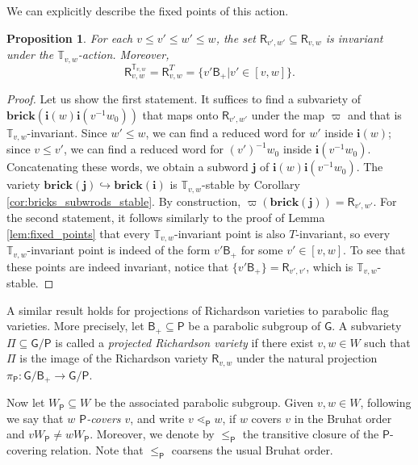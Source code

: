 \documentclass[a4paper, 11pt]{amsart}
\newcommand{\parabolic}{\mathsf{P}}
\newcommand{\brick}{\mathbf{brick}}
\newcommand{\borel}{\mathsf{B}}
\newcommand{\rich}[1]{\mathsf{R}_{#1}}
\newcommand{\word}[1]{\mathbf{#1}}
\newcommand{\group}{\mathsf{G}}
\newcommand{\dil}[1]{\mathbb{T}_{#1}}
\newtheorem{proposition}[theorem]{Proposition}%
\theoremstyle{definition}
\begin{document}
We can explicitly describe the fixed points of this action.

\begin{proposition}\label{prop:fixed-points-richardsons}
For each $v \leq v' \leq w' \leq w$, the set $\rich{v',w'} \subseteq \rich{v,w}$ is invariant under the $\dil{v,w}$-action. Moreover,
\[
\rich{v,w}^{\dil{v,w}} = \rich{v,w}^{T} = \{v'\borel_{+} | v' \in [v,w]\}.\]
\end{proposition}
\begin{proof}
Let us show the first statement. It suffices to find a subvariety of $\brick(\word{i}(w)\word{i}(v^{-1}w_0))$ that maps onto $\rich{v',w'}$ under the map $\varpi$ and that is $\dil{v,w}$-invariant. Since $w' \leq w$, we can find a reduced word for $w'$ inside $\word{i}(w)$; since $v \leq v'$, we can find a reduced word for $(v')^{-1}w_0$ inside $\word{i}(v^{-1}w_0)$. Concatenating these words, we obtain a subword $\word{j}$ of $\word{i}(w)\word{i}(v^{-1}w_0)$. The variety $\brick(\word{j}) \hookrightarrow \brick(\word{i})$ is $\dil{v,w}$-stable by Corollary \ref{cor:bricks_subwrods_stable}. By construction, $\varpi(\brick(\word{j})) = \rich{v',w'}$. For the second statement, it follows similarly to the proof of Lemma \ref{lem:fixed_points} that every $\dil{v,w}$-invariant point is also $T$-invariant, so every $\dil{v,w}$-invariant point is indeed of the form $v'\borel_{+}$ for some $v' \in [v,w]$. To see that these points are indeed invariant, notice that $\{v'\borel_{+}\} = \rich{v',v'}$, which is $\dil{v,w}$-stable.
\end{proof}

A similar result holds for projections of Richardson varieties to parabolic flag varieties. More precisely, let $\borel_{+} \subseteq \parabolic$ be a parabolic subgroup of $\group$. A subvariety $\Pi \subseteq \group/\parabolic$ is called a \emph{projected Richardson variety} if there exist $v, w \in W$ such that $\Pi$ is the image of the Richardson variety $\rich{v,w}$ under the natural projection $\pi_{\parabolic}: \group/\borel_{+} \to \group/\parabolic$.

Now let $W_{\parabolic} \subseteq W$ be the associated parabolic subgroup. Given $v, w \in W$, following \cite[Section 2]{KLS_projections} we say that \emph{$w$ $\parabolic$-covers $v$}, and write $v \lessdot_{\parabolic} w$, if $w$ covers $v$ in the Bruhat order and $vW_{\parabolic} \neq wW_{\parabolic}$. Moreover, we denote by $\leq_{\parabolic}$ the transitive closure of the $\parabolic$-covering relation. Note that $\leq_{\parabolic}$ coarsens the usual Bruhat order. 
\end{document}
